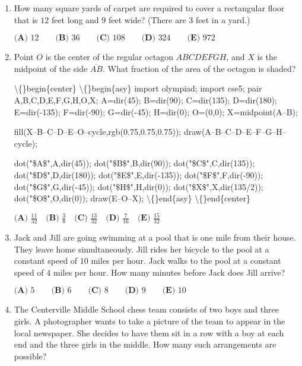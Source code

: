 \documentclass{article}
\begin{document}
\begin{enumerate}[label=\arabic*., itemsep=0.5em]\item How many square yards of carpet are required to cover a rectangular floor that is \(12\) feet long and \(9\) feet wide? (There are \(3\) feet in a yard.)

\(\textbf{(A) }12\qquad\textbf{(B) }36\qquad\textbf{(C) }108\qquad\textbf{(D) }324\qquad \textbf{(E) }972\)\par \vspace{0.5em}\item Point \(O\) is the center of the regular octagon \(ABCDEFGH\), and \(X\) is the midpoint of the side \(\overline{AB}.\) What fraction of the area of the octagon is shaded?


\textbackslash\{\}begin\{center\}
\textbackslash\{\}begin\{asy\}
import olympiad;
import cse5;
pair A,B,C,D,E,F,G,H,O,X;
A=dir(45);
B=dir(90);
C=dir(135);
D=dir(180);
E=dir(-135);
F=dir(-90);
G=dir(-45);
H=dir(0);
O=(0,0);
X=midpoint(A--B);

fill(X--B--C--D--E--O--cycle,rgb(0.75,0.75,0.75));
draw(A--B--C--D--E--F--G--H--cycle);

dot("\$A\$",A,dir(45));
dot("\$B\$",B,dir(90));
dot("\$C\$",C,dir(135));
dot("\$D\$",D,dir(180));
dot("\$E\$",E,dir(-135));
dot("\$F\$",F,dir(-90));
dot("\$G\$",G,dir(-45));
dot("\$H\$",H,dir(0));
dot("\$X\$",X,dir(135/2));
dot("\$O\$",O,dir(0));
draw(E--O--X);
\textbackslash\{\}end\{asy\}
\textbackslash\{\}end\{center\}


\(\textbf{(A) }\frac{11}{32} \quad\textbf{(B) }\frac{3}{8} \quad\textbf{(C) }\frac{13}{32} \quad\textbf{(D) }\frac{7}{16}\quad \textbf{(E) }\frac{15}{32}\)\par \vspace{0.5em}\item Jack and Jill are going swimming at a pool that is one mile from their house. They leave home simultaneously. Jill rides her bicycle to the pool at a constant speed of \(10\) miles per hour. Jack walks to the pool at a constant speed of \(4\) miles per hour. How many minutes before Jack does Jill arrive?

\(\textbf{(A) }5\qquad\textbf{(B) }6\qquad\textbf{(C) }8\qquad\textbf{(D) }9\qquad \textbf{(E) }10\)\par \vspace{0.5em}\item The Centerville Middle School chess team consists of two boys and three girls. A photographer wants to take a picture of the team to appear in the local newspaper. She decides to have them sit in a row with a boy at each end and the three girls in the middle. How many such arrangements are possible? 


\end{enumerate}
\end{document}
